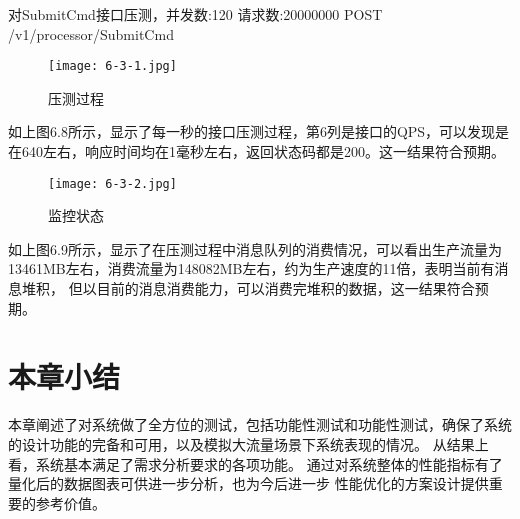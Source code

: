 对SubmitCmd接口压测，并发数:120 请求数:20000000
POST /v1/processor/SubmitCmd

\begin{figure}[H]
    \centering
    \texttt{[image: 6-3-1.jpg]}
    \caption{压测过程}
    \label{压测过程}
\end{figure}
如上图6.8所示，显示了每一秒的接口压测过程，第6列是接口的QPS，可以发现是在640左右，响应时间均在1毫秒左右，返回状态码都是200。这一结果符合预期。

\begin{figure}[H]
    \centering
    \texttt{[image: 6-3-2.jpg]}
    \caption{监控状态}
    \label{监控状态}
\end{figure}
如上图6.9所示，显示了在压测过程中消息队列的消费情况，可以看出生产流量为13461MB左右，消费流量为148082MB左右，约为生产速度的11倍，表明当前有消息堆积，
但以目前的消息消费能力，可以消费完堆积的数据，这一结果符合预期。
%
%


\section{本章小结}

本章阐述了对系统做了全方位的测试，包括功能性测试和功能性测试，确保了系统的设计功能的完备和可用，以及模拟大流量场景下系统表现的情况。
从结果上看，系统基本满足了需求分析要求的各项功能。 通过对系统整体的性能指标有了量化后的数据图表可供进一步分析，也为今后进一步
性能优化的方案设计提供重要的参考价值。